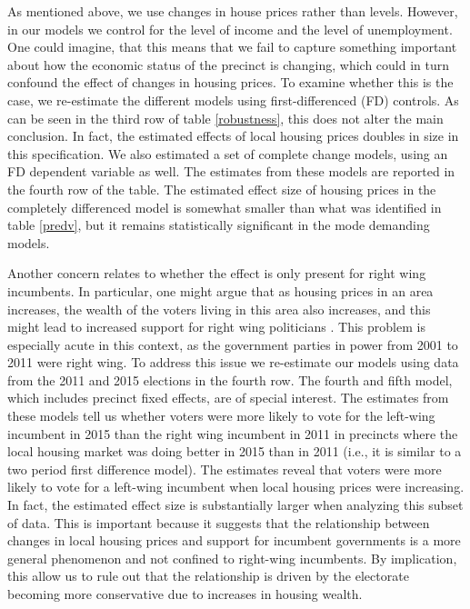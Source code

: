 \documentclass[12pt,a4paper]{article}
\begin{document}
	As mentioned above, we use changes in house prices rather than levels. However, in our models we control for the level of income and the level of unemployment. One could imagine, that this means that we fail to capture something important about how the economic status of the precinct is changing, which could in turn confound the effect of changes in housing prices. To examine whether this is the case, we re-estimate the different models using first-differenced (FD) controls. As can be seen in the third row of table \ref{robustness}, this does not alter the main conclusion. In fact, the estimated effects of local housing prices doubles in size in this specification. We also estimated a set of complete change models, using an FD dependent variable as well. The estimates from these models are reported in the fourth row of the table. The estimated effect size of housing prices in the completely differenced model is somewhat smaller than what was identified in table \ref{predv}, but it remains statistically significant in the mode demanding models.
	
	Another concern relates to whether the effect is only present for right wing incumbents. In particular, one might argue that as housing prices in an area increases, the wealth of the voters living in this area also increases, and this might lead to increased support for right wing politicians \cite{ansell2014political}. This problem is especially acute in this context, as the government parties in power from 2001 to 2011 were right wing. To address this issue we re-estimate our models using data from the 2011 and 2015 elections in the fourth row. The fourth and fifth model, which includes precinct fixed effects, are of special interest. The estimates from these models tell us whether voters were more likely to vote for the left-wing incumbent in 2015 than the right wing incumbent in 2011 in precincts where the local housing market was doing better in 2015 than in 2011 (i.e., it is similar to a two period first difference model). The estimates reveal that voters were more likely to vote for a left-wing incumbent when local housing prices were increasing. In fact, the estimated effect size is substantially larger when analyzing this subset of data. This is important because it suggests that the relationship between changes in local housing prices and support for incumbent governments is a more general phenomenon and not confined to right-wing incumbents. By implication, this allow us to rule out that the relationship is driven by the electorate becoming more conservative due to increases in housing wealth.
	
\end{document}
